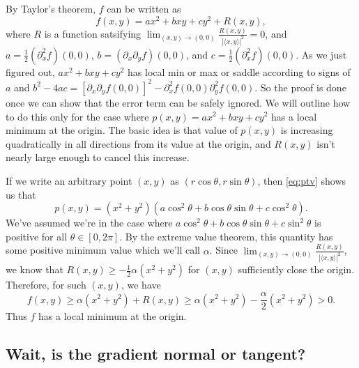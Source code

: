 \documentclass{watsonbook}
\begin{document}
\begin{pf}
      By Taylor's theorem, $f$ can be written as
      \[
        f(x,y) = ax^2 + bxy + cy^2 + R(x,y), 
      \]
    where $R$ is a function satsifying
    $\lim_{(x,y) \to (0,0)}\frac{R(x,y)}{|\langle x,y \rangle|^2} =
    0$, and $a = \tfrac{1}{2}(\partial_x^2f)(0,0)$,
    $b = (\partial_x\partial_y f)(0,0)$, and
    $c = \tfrac{1}{2}(\partial_x^2f)(0,0)$. As we just figured out,
    $ax^2 + bxy + cy^2$ has local min or max or saddle according to
    signs of $a$ and
    $b^2 - 4ac = [\partial_x\partial_y f(0,0)]^2 -
    \partial_x^2f(0,0)\partial_y^2 f(0,0)$. So the proof is done once
    we can show that the error term can be safely ignored. We will
    outline how to do this only for the case where
    $p(x,y) = ax^2 + bxy + cy^2$ has a local minimum at the
    origin. The basic idea is that value of $p(x,y)$ is increasing
    quadratically in all directions from its value at the origin, and
    $R(x,y)$ isn't nearly large enough to cancel this increase. 

    If we write an arbitrary point $(x,y)$ as
    $(r\cos \theta, r\sin \theta)$, then \eqref{eq:ptv} shows us that
    \[
      p(x,y) = (x^2+y^2)(a\cos^2 \theta + b \cos \theta \sin \theta +
      c \cos^2 \theta). 
    \]
    We've assumed we're in the case where
    $a\cos^2 \theta + b \cos \theta \sin \theta + c \sin^2 \theta$ is
    positive for all $\theta \in [0,2\pi]$. By the extreme value
    theorem, this quantity has some positive minimum value which we'll
    call $\alpha$.  Since
    $\lim_{(x,y) \to (0,0)}\frac{R(x,y)}{|\langle x,y \rangle|^2}$, we
    know that $R(x,y) \geq -\tfrac{1}{2}\alpha(x^2+y^2)$ for $(x,y)$
    sufficiently close the origin. Therefore, for such $(x,y)$, we
    have
    \[
      f(x,y)  \geq \alpha(x^2 + y^2) + R(x,y) \geq
      \alpha(x^2 + y^2) - \frac{\alpha}{2}(x^2+y^2) > 0.
    \]
    Thus $f$ has a local minimum at the origin. 
  \end{pf}

  \newpage

  \subsection{Wait, is the gradient normal or
  tangent?} \label{sec:gradienta}
\end{document}
